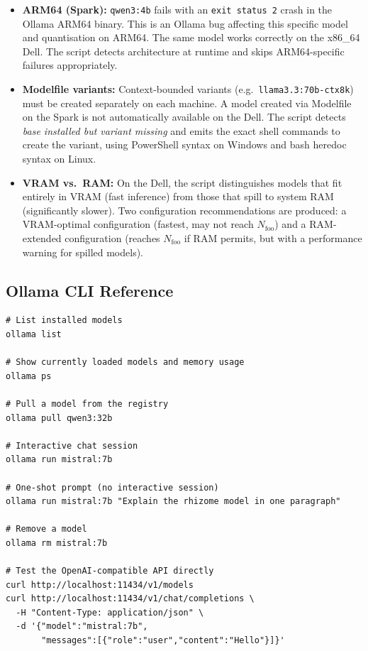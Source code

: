 \begin{itemize}
  \item \textbf{ARM64 (Spark):} \texttt{qwen3:4b} fails with an
        \texttt{exit~status~2} crash in the Ollama ARM64 binary. This is
        an Ollama bug affecting this specific model and quantisation on
        ARM64. The same model works correctly on the x86\_64 Dell. The
        script detects architecture at runtime and skips ARM64-specific
        failures appropriately.

  \item \textbf{Modelfile variants:} Context-bounded variants (e.g.\
        \texttt{llama3.3:70b-ctx8k}) must be created separately on each
        machine. A model created via Modelfile on the Spark is not
        automatically available on the Dell. The script detects
        \emph{base installed but variant missing} and emits the exact
        shell commands to create the variant, using PowerShell syntax on
        Windows and bash heredoc syntax on Linux.

  \item \textbf{VRAM vs.\ RAM:} On the Dell, the script distinguishes
        models that fit entirely in VRAM (fast inference) from those that
        spill to system RAM (significantly slower). Two configuration
        recommendations are produced: a VRAM-optimal configuration
        (fastest, may not reach $N_{\text{foo}}$) and a RAM-extended
        configuration (reaches $N_{\text{foo}}$ if RAM permits, but with
        a performance warning for spilled models).
\end{itemize}

\subsection{Ollama CLI Reference}

\begin{lstlisting}[style=bashstyle, caption={Essential Ollama CLI commands}]
# List installed models
ollama list

# Show currently loaded models and memory usage
ollama ps

# Pull a model from the registry
ollama pull qwen3:32b

# Interactive chat session
ollama run mistral:7b

# One-shot prompt (no interactive session)
ollama run mistral:7b "Explain the rhizome model in one paragraph"

# Remove a model
ollama rm mistral:7b

# Test the OpenAI-compatible API directly
curl http://localhost:11434/v1/models
curl http://localhost:11434/v1/chat/completions \
  -H "Content-Type: application/json" \
  -d '{"model":"mistral:7b",
       "messages":[{"role":"user","content":"Hello"}]}'
\end{lstlisting}

